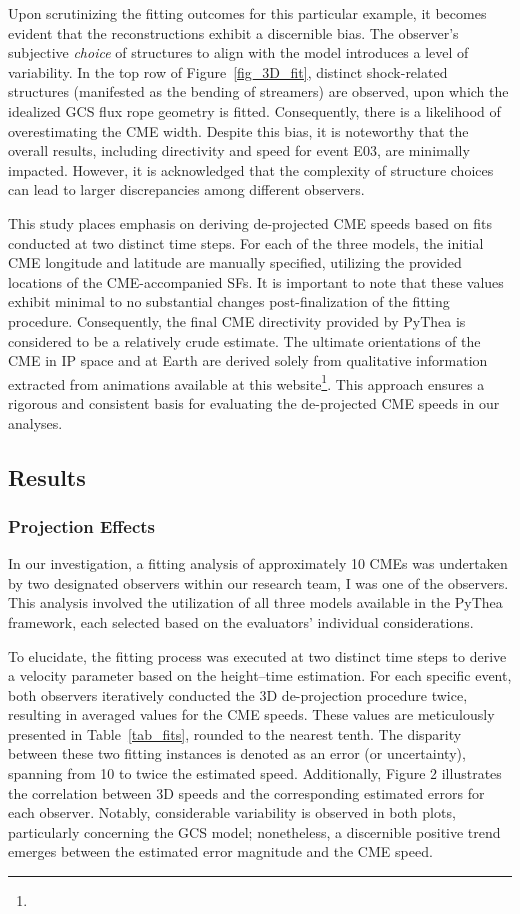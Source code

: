 Upon scrutinizing the fitting outcomes for this particular example, it becomes evident that the reconstructions exhibit a discernible bias. The observer's subjective \textit{choice} of structures to align with the model introduces a level of variability. In the top row of Figure~\ref{fig_3D_fit}, distinct shock-related structures (manifested as the bending of streamers) are observed, upon which the idealized GCS flux rope geometry is fitted. Consequently, there is a likelihood of overestimating the CME width. Despite this bias, it is noteworthy that the overall results, including directivity and speed for event E03, are minimally impacted. However, it is acknowledged that the complexity of structure choices can lead to larger discrepancies among different observers.

This study places emphasis on deriving de-projected CME speeds based on fits conducted at two distinct time steps. For each of the three models, the initial CME longitude and latitude are manually specified, utilizing the provided locations of the CME-accompanied SFs. It is important to note that these values exhibit minimal to no substantial changes post-finalization of the fitting procedure. Consequently, the final CME directivity provided by PyThea is considered to be a relatively crude estimate. The ultimate orientations of the CME in IP space and at Earth are derived solely from qualitative information extracted from animations available at this website\footnote{\helioweatherurl}. This approach ensures a rigorous and consistent basis for evaluating the de-projected CME speeds in our analyses.

\subsection{Results}
\subsubsection{Projection Effects}
In our investigation, a fitting analysis of approximately 10 CMEs was undertaken by two designated observers within our research team, I was one of the observers. This analysis involved the utilization of all three models available in the PyThea framework, each selected based on the evaluators' individual considerations.

To elucidate, the fitting process was executed at two distinct time steps to derive a velocity parameter based on the height–time estimation. For each specific event, both observers iteratively conducted the 3D de-projection procedure twice, resulting in averaged values for the CME speeds. These values are meticulously presented in Table~\ref{tab_fits}, rounded to the nearest tenth. The disparity between these two fitting instances is denoted as an error (or uncertainty), spanning from 10 \kms to twice the estimated speed. Additionally, Figure 2 illustrates the correlation between 3D speeds and the corresponding estimated errors for each observer. Notably, considerable variability is observed in both plots, particularly concerning the GCS model; nonetheless, a discernible positive trend emerges between the estimated error magnitude and the CME speed.

